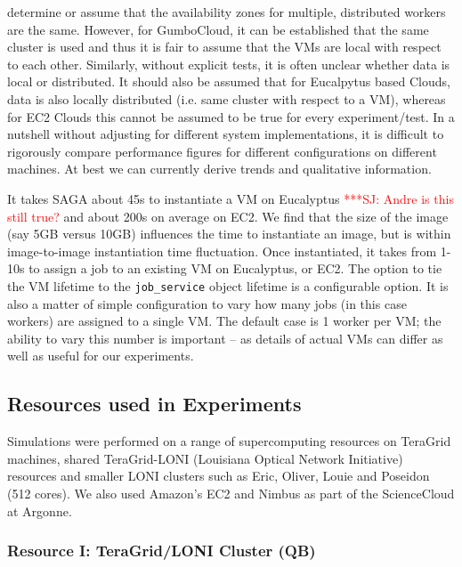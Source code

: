 \documentclass[conference,final]{IEEEtran}
\newcommand{\jhanote}[1]{ {\textcolor{red} { ***SJ: #1 }}}
\newcommand{\jhanote}[1]{}
\begin{document}
determine or assume that the availability zones for multiple,
distributed workers are the same. However, for GumboCloud, it can be
established that the same cluster is used and thus it is fair to
assume that the VMs are local with respect to each other.  Similarly,
without explicit tests, it is often unclear whether data is local or
distributed.  It should also be assumed that for Eucalpytus based
Clouds, data is also locally distributed (i.e.  same cluster with
respect to a VM), whereas for EC2 Clouds this cannot be assumed to be
true for every experiment/test. In a nutshell without adjusting for
different system implementations, it is difficult to rigorously
compare performance figures for different configurations on different
machines. At best we can currently derive trends and qualitative
information.

It takes SAGA about 45s to instantiate a VM on Eucalyptus
\jhanote{Andre is this still true?}  and about 200s on average on EC2.
We find that the size of the image (say 5GB versus 10GB) influences
the time to instantiate an image, but is within image-to-image
instantiation time fluctuation.  Once instantiated, it takes from
1-10s to assign a job to an existing VM on Eucalyptus, or EC2.  The
option to tie the VM lifetime to the \texttt{job\_service} object
lifetime is a configurable option.  It is also a matter of simple
configuration to vary how many jobs (in this case workers) are
assigned to a single VM. The default case is 1 worker per VM; the
ability to vary this number is important -- as details of actual VMs
can differ as well as useful for our experiments.

\subsection{Resources used in Experiments}

Simulations were performed on a range of supercomputing resources on
TeraGrid machines, shared TeraGrid-LONI (Louisiana Optical Network
Initiative)~\cite{LONI_web} resources and smaller LONI clusters such
as Eric, Oliver, Louie and Poseidon (512 cores).  We also used
Amazon's EC2 and Nimbus as part of the ScienceCloud at Argonne.

\subsubsection*{Resource I: TeraGrid/LONI Cluster (QB)}
\end{document}
